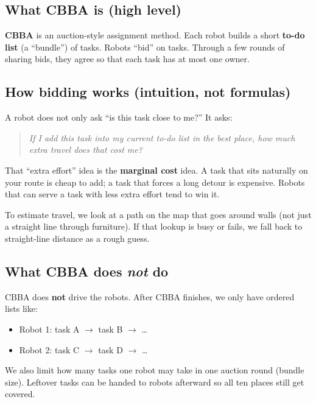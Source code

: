 \documentclass[11pt,a4paper]{article}
\begin{document}
\subsection{What CBBA is (high level)}

\textbf{CBBA} is an auction-style assignment method. Each robot builds a short
\textbf{to-do list} (a ``bundle'') of tasks. Robots ``bid'' on tasks. Through a
few rounds of sharing bids, they agree so that each task has at most one
owner.

\subsection{How bidding works (intuition, not formulas)}

A robot does not only ask ``is this task close to me?'' It asks:

\begin{quote}
\emph{If I add this task into my current to-do list in the best place, how much
extra travel does that cost me?}
\end{quote}

That ``extra effort'' idea is the \textbf{marginal cost} idea. A task that sits
naturally on your route is cheap to add; a task that forces a long detour is
expensive. Robots that can serve a task with less extra effort tend to win it.

To estimate travel, we look at a path on the map that goes around walls (not
just a straight line through furniture). If that lookup is busy or fails, we
fall back to straight-line distance as a rough guess.

\subsection{What CBBA does \emph{not} do}

CBBA does \textbf{not} drive the robots. After CBBA finishes, we only have
ordered lists like:

\begin{itemize}[leftmargin=*]
  \item Robot 1: task A $\rightarrow$ task B $\rightarrow$ \ldots
  \item Robot 2: task C $\rightarrow$ task D $\rightarrow$ \ldots
\end{itemize}

We also limit how many tasks one robot may take in one auction round (bundle
size). Leftover tasks can be handed to robots afterward so all ten places
still get covered.
\end{document}
